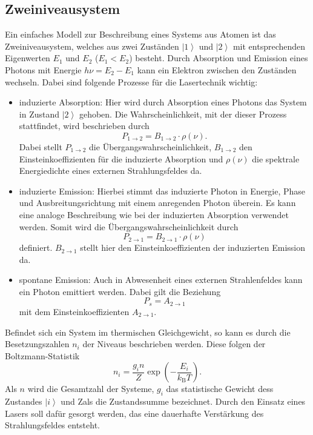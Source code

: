 \subsection{Zweiniveausystem}
Ein einfaches Modell zur Beschreibung eines Systems aus Atomen ist das Zweiniveausystem,
welches aus zwei Zuständen $\left| 1 \right>$ und $\left| 2 \right>$ mit entsprechenden
Eigenwerten $E_1$ und $E_2$ ($E_1<E_2$) besteht.
Durch Absorption und Emission eines Photons mit
Energie $h\nu=E_2-E_1$ kann ein Elektron zwischen den Zuständen wechseln.
Dabei sind folgende Prozesse für die Lasertechnik wichtig:
\begin{itemize}
  \item induzierte Absorption:
  Hier wird durch Absorption eines Photons das System in Zustand $\left| 2 \right>$
  gehoben. Die Wahrscheinlichkeit, mit der dieser Prozess stattfindet, wird beschrieben
  durch
  \begin{equation}
    P_{1\rightarrow 2} = B_{1\rightarrow 2}\cdot \rho(\nu).
  \end{equation}
  Dabei stellt $P_{1\rightarrow 2}$ die Übergangswahrscheinlichkeit, $B_{1\rightarrow 2}$ den
  Einsteinkoeffizienten für die induzierte Absorption und $\rho(\nu)$ die spektrale Energiedichte
  eines externen Strahlungsfeldes da.
  \item induzierte Emission:
  Hierbei stimmt das induzierte Photon in Energie, Phase und Ausbreitungsrichtung
  mit einem anregenden Photon überein. Es kann eine analoge Beschreibung wie bei der
  induzierten Absorption verwendet werden.
  Somit wird die Übergangswahrscheinlichkeit durch
  \begin{equation}
    P_{2\rightarrow 1} = B_{2\rightarrow 1}\cdot\rho(\nu)
  \end{equation}
  definiert. $B_{2\rightarrow 1}$ stellt hier den Einsteinkoeffizienten der induzierten
  Emission da.
  \item spontane Emission:
  Auch in Abwesenheit eines externen Strahlenfeldes kann ein Photon emittiert werden.
  Dabei gilt die Beziehung
  \begin{equation}
    P_s = A_{2\rightarrow 1}
  \end{equation}
  mit dem Einsteinkoeffizienten $A_{2\rightarrow 1}$.
\end{itemize}

Befindet sich ein System im thermischen Gleichgewicht, so kann es durch die
Besetzungszahlen $n_i$ der Niveaus beschrieben werden. Diese folgen der Boltzmann-Statistik
\begin{equation}
    n_i = \frac{g_in}{Z}\exp\left(-\frac{E_i}{k_\text{B}T}\right).
\end{equation}
Als $n$ wird die Gesamtzahl der Systeme, $g_i$ das statistische Gewicht dess Zustandes
$\left| i \right>$ und Zals die Zustandssumme bezeichnet. Durch den Einsatz
eines Lasers soll dafür gesorgt werden, das eine dauerhafte Verstärkung des
Strahlungsfeldes entsteht.


